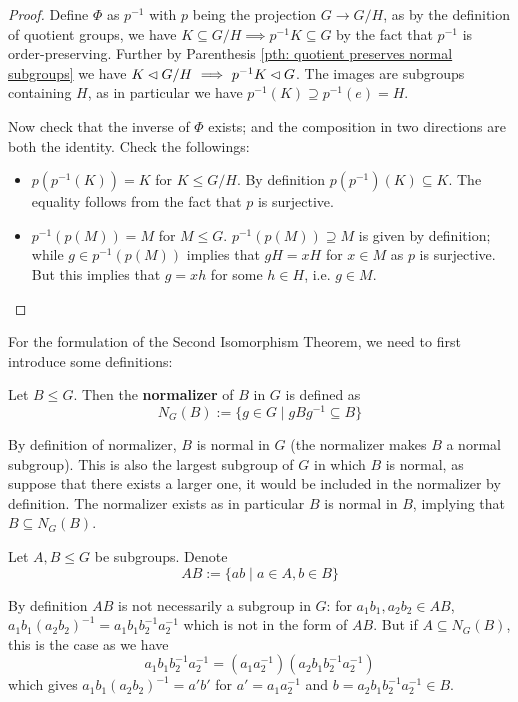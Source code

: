 \documentclass{article}
\begin{document}
\begin{proof}
    Define $\Phi$ as $p^{-1}$ with $p$ being the projection $G \to G/H$, as by the definition of quotient groups, we have $K \subseteq G/H \implies p^{-1}K \subseteq G$ by the fact that $p^{-1}$ is order-preserving. Further by Parenthesis \ref{pth: quotient preserves normal subgroups} we have $K \lhd G/H \ \Longrightarrow\  p^{-1}K \lhd G$. The images are subgroups containing $H$, as in particular we have $p^{-1}(K) \supseteq p^{-1}(e) = H$. 

    Now check that the inverse of $\Phi$ exists; and the composition in two directions are both the identity. Check the followings:
    \begin{itemize}
        \item $p(p^{-1}(K)) = K$ for $K \leq G/H$. By definition $p(p^{-1})(K) \subseteq K$. The equality follows from the fact that $p$ is surjective.
        \item $p^{-1}(p(M)) = M$ for $M \leq G$. $p^{-1}(p(M)) \supseteq M$ is given by definition; while $g \in p^{-1}(p(M))$ implies that $gH = xH$ for $x \in M$ as $p$ is surjective. But this implies that $g = xh$ for some $h \in H$, i.e. $g \in M$.
    \end{itemize}
\end{proof}

For the formulation of the Second Isomorphism Theorem, we need to first introduce some definitions:
\begin{definition}
    Let $B \leq G$. Then the \textbf{normalizer} of $B$ in $G$ is defined as
    \[
        N_G(B) := \{ g \in G \mid gBg^{-1} \subseteq B \}
    \]
\end{definition}

\begin{remark}
    By definition of normalizer, $B$ is normal in $G$ (the normalizer makes $B$ a normal subgroup). This is also the largest subgroup of $G$ in which $B$ is normal, as suppose that there exists a larger one, it would be included in the normalizer by definition. The normalizer exists as in particular $B$ is normal in $B$, implying that $B \subseteq N_G(B)$.
\end{remark}

\begin{notation}
    Let $A, B \leq G$ be subgroups. Denote
    \[
        AB := \{ ab \mid a \in A, b \in B \}
    \]
\end{notation}

\begin{remark}
    By definition $AB$ is not necessarily a subgroup in $G$: for $a_1b_1, a_2 b_2 \in AB$, $a_1 b_1(a_2 b_2)^{-1} = a_1 b_1 b_2^{-1} a_2^{-1}$ which is not in the form of $AB$. But if $A \subseteq N_G(B)$, this is the case as we have
    \[
        a_1 b_1 b_2^{-1} a_2^{-1} = (a_1 a_2^{-1}) (a_2 b_1 b_2^{-1} a_2^{-1})
    \]
    which gives $a_1 b_1 (a_2 b_2)^{-1} = a' b'$ for $a' = a_1 a_2^{-1}$ and $b = a_2 b_1 b_2^{-1} a_2^{-1} \in B$.
\end{remark}
\end{document}
